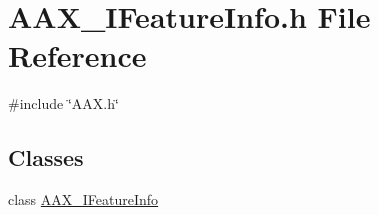 \hypertarget{a00602}{}\section{A\+A\+X\+\_\+\+I\+Feature\+Info.\+h File Reference}
\label{a00602}
{\ttfamily \#include \char`\"{}A\+A\+X.\+h\char`\"{}}\newline
\subsection*{Classes}
\begin{DoxyCompactItemize}
\item 
class \mbox{\hyperlink{a01829}{A\+A\+X\+\_\+\+I\+Feature\+Info}}
\end{DoxyCompactItemize}
